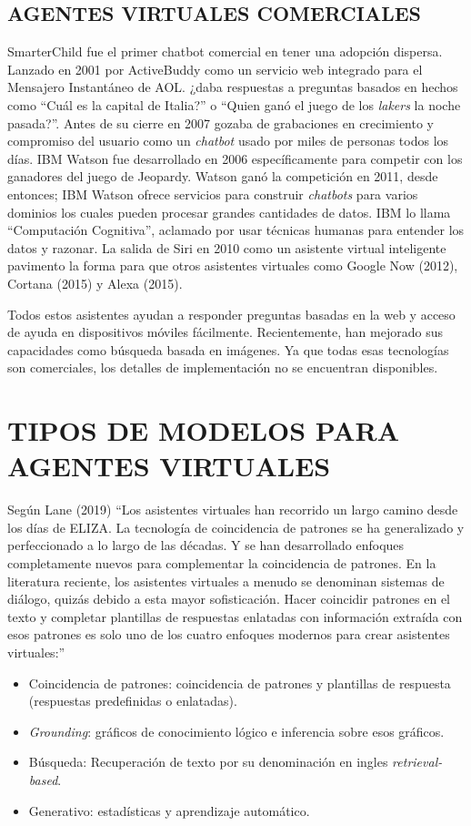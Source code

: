 \documentclass[letter, openright, 12pt]{book}
\begin{document}
\subsection{AGENTES VIRTUALES COMERCIALES}
SmarterChild fue el primer chatbot comercial en tener una adopción dispersa. Lanzado en 2001 por ActiveBuddy como un servicio web integrado para el Mensajero Instantáneo de AOL. ¿daba respuestas a preguntas basados en hechos como “Cuál es la capital de Italia?” o “Quien ganó el juego de los \textit{lakers} la noche pasada?”. Antes de su cierre en 2007 gozaba de grabaciones en crecimiento y compromiso del usuario como un \textit{chatbot} usado por miles de personas todos los días. IBM Watson fue desarrollado en 2006 específicamente para competir con los ganadores del juego de Jeopardy. Watson ganó la competición en 2011, desde entonces; IBM Watson ofrece servicios para construir \textit{chatbots} para varios dominios los cuales pueden procesar grandes cantidades de datos. IBM lo llama “Computación Cognitiva”, aclamado por usar técnicas humanas para entender los datos y razonar. La salida de Siri en 2010 como un asistente virtual inteligente pavimento la forma para que otros asistentes virtuales como Google Now (2012), Cortana (2015) y Alexa (2015). \par
Todos estos asistentes ayudan a responder preguntas basadas en la web y acceso de ayuda en dispositivos móviles fácilmente. Recientemente, han mejorado sus capacidades como búsqueda basada en imágenes. Ya que todas esas tecnologías son comerciales, los detalles de implementación no se encuentran disponibles.

\section{TIPOS DE MODELOS PARA AGENTES VIRTUALES}
Según Lane (2019) “Los asistentes virtuales han recorrido un largo camino desde los días de ELIZA. La tecnología de coincidencia de patrones se ha generalizado y perfeccionado a lo largo de las décadas. Y se han desarrollado enfoques completamente nuevos para complementar la coincidencia de patrones. En la literatura reciente, los asistentes virtuales a menudo se denominan sistemas de diálogo, quizás debido a esta mayor sofisticación. Hacer coincidir patrones en el texto y completar plantillas de respuestas enlatadas con información extraída con esos patrones es solo uno de los cuatro enfoques modernos para crear asistentes virtuales:”

\begin{itemize}
\item Coincidencia de patrones: coincidencia de patrones y plantillas de respuesta (respuestas predefinidas o enlatadas).
\item \textit{Grounding}: gráficos de conocimiento lógico e inferencia sobre esos gráficos.
\item Búsqueda: Recuperación de texto por su denominación en ingles \textit{retrieval-based}.
\item Generativo: estadísticas y aprendizaje automático.
\end{itemize}
\end{document}
